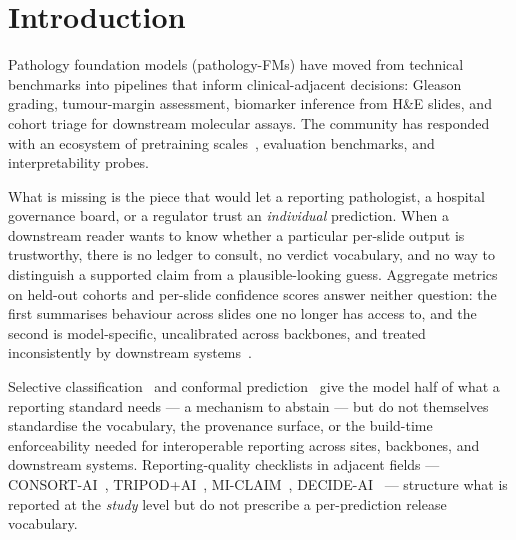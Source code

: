 \documentclass{article}
\begin{document}
\section{Introduction}
\label{sec:intro}

Pathology foundation models (pathology-FMs) have moved from technical benchmarks into pipelines that inform clinical-adjacent decisions: Gleason grading, tumour-margin assessment, biomarker inference from H\&E slides, and cohort triage for downstream molecular assays. The community has responded with an ecosystem of pretraining scales~\citep{filiot2023phikon,chen2024uni,xu2024gigapath,vorontsov2024virchow,wang2022ctranspath}, evaluation benchmarks, and interpretability probes.

What is missing is the piece that would let a reporting pathologist, a hospital governance board, or a regulator trust an \emph{individual} prediction. When a downstream reader wants to know whether a particular per-slide output is trustworthy, there is no ledger to consult, no verdict vocabulary, and no way to distinguish a supported claim from a plausible-looking guess. Aggregate metrics on held-out cohorts and per-slide confidence scores answer neither question: the first summarises behaviour across slides one no longer has access to, and the second is model-specific, uncalibrated across backbones, and treated inconsistently by downstream systems~\citep{kompa2021second}.

Selective classification~\citep{chow1970,cortes2016reject,geifman2017selective,geifman2019selectivenet} and conformal prediction~\citep{vovk2005algorithmic,angelopoulos2021gentle,romano2020classification,olsson2022estimating} give the model half of what a reporting standard needs --- a mechanism to abstain --- but do not themselves standardise the vocabulary, the provenance surface, or the build-time enforceability needed for interoperable reporting across sites, backbones, and downstream systems. Reporting-quality checklists in adjacent fields --- CONSORT-AI~\citep{liu2020consort}, TRIPOD+AI~\citep{collins2024tripod}, MI-CLAIM~\citep{norgeot2020miclaim}, DECIDE-AI~\citep{vasey2022decide} --- structure what is reported at the \emph{study} level but do not prescribe a per-prediction release vocabulary.
\end{document}
